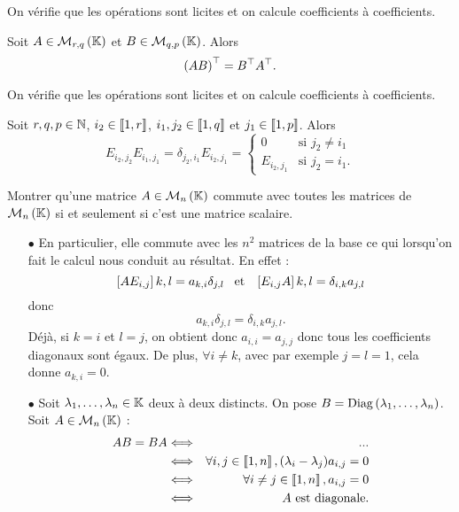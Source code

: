 \documentclass{magnolia}
\begin{document}
\begin{preuve}
On vérifie que les opérations sont licites et on calcule coefficients à coefficients.
\end{preuve}

\begin{proposition}[utile=-3]
Soit $A\in\mathcal{M}_{r,q}\left(\mathbb{K}\right)$ et $B\in\mathcal{M}_{q,p}\left(\mathbb{K}\right)$. Alors
\[{\left(AB\right)}^{\top}={B}^{\top}{A}^{\top}.\]
\end{proposition}

\begin{preuve}
On vérifie que les opérations sont licites et on calcule coefficients à coefficients.
\end{preuve}

\begin{proposition}[utile=-3]
  Soit $r,q,p\in\mathbb{N}$, $i_2\in\left\llbracket 1,r\right\rrbracket$, $i_1,j_2\in\left\llbracket 1,q\right\rrbracket$ et
  $j_1\in\left\llbracket 1,p\right\rrbracket$. Alors
  \[E_{i_2,j_2}E_{i_1,j_1}=\delta_{j_2,i_1} E_{i_2,j_1}=
    \begin{cases}
    0 & \text{si $j_2\neq i_1$}\\
    E_{i_2,j_1} & \text{si $j_2=i_1$.}
    \end{cases}\]
  \end{proposition}


\begin{exoUnique}
\exo Montrer qu'une matrice $A\in\mathcal{M}_{n}\left(\mathbb{K}\right)$ commute avec toutes les
matrices de $\mathcal{M}_{n}\left(\mathbb{K}\right)$ si et seulement si c'est une matrice scalaire.
\begin{sol}
\begin{itemize}
\item[$\bullet$]En particulier, elle commute avec les $n^2$ matrices de la base ce qui lorsqu'on fait le calcul nous conduit au résultat. En effet :
$$\left[AE_{i,j}\right]{k,l}=a_{k,i}\delta_{j,l} \quad\!\text{et}\quad\! \left[E_{i,j}A\right]{k,l}=\delta_{i,k}a_{j,l}$$ donc $$a_{k,i}\delta_{j,l}=\delta_{i,k}a_{j,l}.$$ Déjà, si $k=i$ et $l=j$, on obtient donc $a_{i,i}=a_{j,j}$ donc tous les coefficients diagonaux sont égaux. De plus, $\forall i\neq k$, avec par exemple $j=l=1$, cela donne $a_{k,i}=0$.
\item[$\bullet$] Soit $\lambda_1,\ldots,\lambda_n\in\mathbb{K}$ deux à deux distincts. On pose $B=\mathop{\rm{Diag}}\left(\lambda_1,\ldots,\lambda_n\right)$. Soit $A\in \mathcal{M}_{n}\left(\mathbb{K}\right)$ :
\begin{eqnarray*}
AB=BA &\Longleftrightarrow & ...\\
&\Longleftrightarrow & \forall i,j \in \left\llbracket 1,n\right\rrbracket, (\lambda_i-\lambda_j)a_{i,j}=0\\
&\Longleftrightarrow & \forall i\neq j \in \left\llbracket 1,n\right\rrbracket, a_{i,j}=0\\
&\Longleftrightarrow & A \text{ est diagonale.}  
\end{eqnarray*}
\end{itemize}
\end{sol}
\end{exoUnique}
\end{document}
